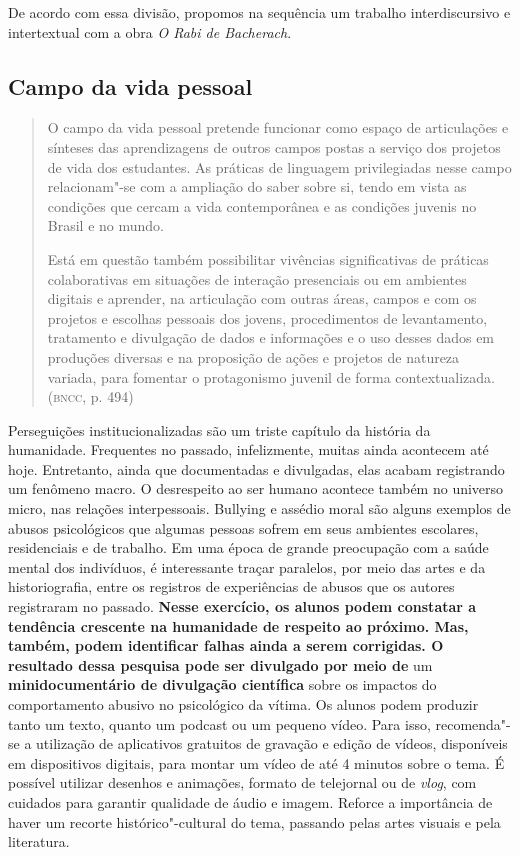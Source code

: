 \documentclass[12pt]{extarticle}
\begin{document}
De acordo com essa divisão, propomos na sequência um trabalho
interdiscursivo e intertextual com a obra \emph{O Rabi de Bacherach}.

\subsection{Campo da vida pessoal}

\begin{quote}
O campo da vida pessoal pretende funcionar como espaço de articulações
e sínteses das aprendizagens de outros campos postas a serviço dos
projetos de vida dos estudantes. As práticas de linguagem privilegiadas
nesse campo relacionam"-se com a ampliação do saber sobre si, tendo em
vista as condições que cercam a vida contemporânea e as condições
juvenis no Brasil e no mundo.

Está em questão também possibilitar vivências significativas de práticas
colaborativas em situações de interação presenciais ou em ambientes
digitais e aprender, na articulação com outras áreas, campos e com os
projetos e escolhas pessoais dos jovens, procedimentos de levantamento,
tratamento e divulgação de dados e informações e o uso desses dados em
produções diversas e na proposição de ações e projetos de natureza
variada, para fomentar o protagonismo juvenil de forma
contextualizada. (\textsc{bncc}, p. 494)
\end{quote}

Perseguições institucionalizadas são um triste capítulo da história da
humanidade. Frequentes no passado, infelizmente, muitas ainda
acontecem até hoje. Entretanto, ainda que documentadas e divulgadas,
elas acabam registrando um fenômeno macro. O desrespeito ao ser humano
acontece também no universo micro, nas relações interpessoais.
Bullying e assédio moral são alguns exemplos de abusos psicológicos
que algumas pessoas sofrem em seus ambientes escolares, residenciais e
de trabalho. Em uma época de grande preocupação com a saúde mental dos
indivíduos, é interessante traçar paralelos, por meio das artes e da
historiografia, entre os registros de experiências de abusos que os
autores registraram no passado.\textbf{ Nesse exercício, os alunos
podem constatar a tendência crescente na humanidade de respeito ao
próximo. Mas, também, podem identificar falhas ainda a serem
corrigidas. O resultado dessa pesquisa pode ser divulgado por meio de}
um \textbf{minidocumentário de divulgação científica} sobre os
impactos do comportamento abusivo no psicológico da vítima. Os alunos
podem produzir tanto um texto, quanto um podcast ou um pequeno vídeo.
Para isso, recomenda"-se a utilização de aplicativos gratuitos de
gravação e edição de vídeos, disponíveis em dispositivos digitais,
para montar um vídeo de até 4 minutos sobre o tema. É possível
utilizar desenhos e animações, formato de telejornal ou de
\emph{vlog}, com cuidados para garantir qualidade de áudio e imagem.
Reforce a importância de haver um recorte histórico"-cultural do tema,
passando pelas artes visuais e pela literatura.
\end{document}
